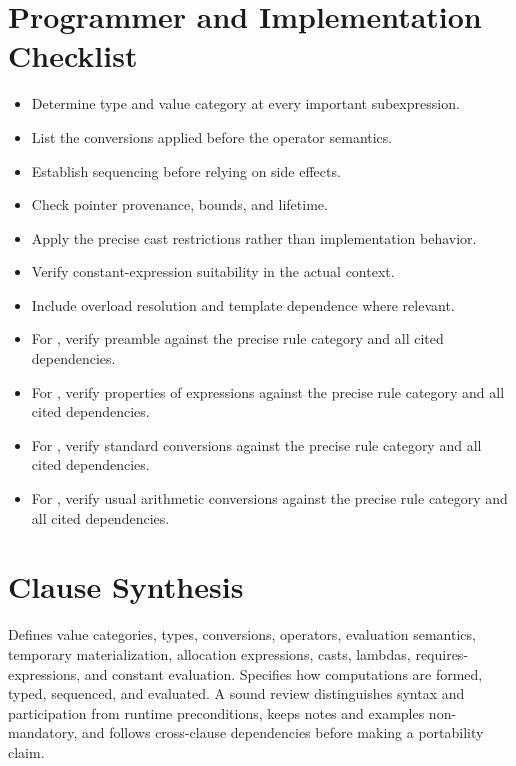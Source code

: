 \documentclass[11pt,letterpaper]{article}
\begin{document}
\section{Programmer and Implementation Checklist}
\begin{CornellReferenceChecklistBox}\begin{itemize}[label=$\square$]
\item Determine type and value category at every important subexpression.
\item List the conversions applied before the operator semantics.
\item Establish sequencing before relying on side effects.
\item Check pointer provenance, bounds, and lifetime.
\item Apply the precise cast restrictions rather than implementation behavior.
\item Verify constant-expression suitability in the actual context.
\item Include overload resolution and template dependence where relevant.
\item For , verify preamble against the precise rule category and all cited dependencies.
\item For , verify properties of expressions against the precise rule category and all cited dependencies.
\item For , verify standard conversions against the precise rule category and all cited dependencies.
\item For , verify usual arithmetic conversions against the precise rule category and all cited dependencies.
\end{itemize}\end{CornellReferenceChecklistBox}
\section{Clause Synthesis}
\begin{CornellReferenceOrientationBox}Defines value categories, types, conversions, operators, evaluation semantics, temporary materialization, allocation expressions, casts, lambdas, requires-expressions, and constant evaluation. Specifies how computations are formed, typed, sequenced, and evaluated. A sound review distinguishes syntax and participation from runtime preconditions, keeps notes and examples non-mandatory, and follows cross-clause dependencies before making a portability claim.\end{CornellReferenceOrientationBox}
\end{document}

